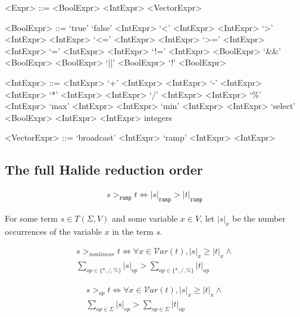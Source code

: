 \documentclass[sigplan,10pt,review,anonymous]{acmart}\settopmatter{printfolios=true,printccs=false,printacmref=false}
\begin{document}
\begin{grammar}
<Expr> ::= <BoolExpr> 
\alt <IntExpr> 
\alt <VectorExpr>

<BoolExpr> ::= `true'
\alt `false'
\alt <IntExpr> `<' <IntExpr>
\alt <IntExpr> `>' <IntExpr>
\alt <IntExpr> `<=' <IntExpr>
\alt <IntExpr> `>=' <IntExpr>
\alt <IntExpr> `=' <IntExpr>
\alt <IntExpr> `!=' <IntExpr>
\alt <BoolExpr> `&&' <BoolExpr>
\alt <BoolExpr> `||' <BoolExpr>
\alt `!' <BoolExpr>

<IntExpr> ::= <IntExpr> `+' <IntExpr>
\alt <IntExpr> `-' <IntExpr>
\alt <IntExpr> `*' <IntExpr>
\alt <IntExpr> `/' <IntExpr>
\alt <IntExpr> `\%' <IntExpr>
\alt `max' <IntExpr> <IntExpr>
\alt `min' <IntExpr> <IntExpr>
\alt `select' <BoolExpr> <IntExpr> <IntExpr>
\alt integers

<VectorExpr> ::= `broadcast' <IntExpr>
\alt `ramp' <IntExpr> <IntExpr>
\end{grammar}

\subsection{The full Halide reduction order}
\label{a:reductionorder}

\begin{equation}
\begin{split}
s >_{\texttt{ramp}} t \iff |s|_{\texttt{ramp}} > |t|_{\texttt{ramp}}
\end{split}
\end{equation}

For some term $s \in T(\Sigma, V)$ and some variable $x \in V$, let $|s|_x$ be the number occurrences of the variable $x$ in the term $s$.

\begin{equation}
\begin{split}
s >_{nonlinear} t \iff \forall x \in \mathcal{V}ar(t), |s|_x \geq |t|_x \wedge \\
\sum_{op \in \{*,/,\%\}} |s|_{op} > \sum_{op \in \{*,/,\%\}} |t|_{op}
\end{split}
\end{equation}

\begin{equation}
\begin{split}
s >_{op} t \iff \forall x \in \mathcal{V}ar(t), |s|_x \geq |t|_x \wedge \\
\sum_{op \in \Sigma} |s|_{op} > \sum_{op \in \Sigma} |t|_{op}
\end{split}
\end{equation}
\end{document}
